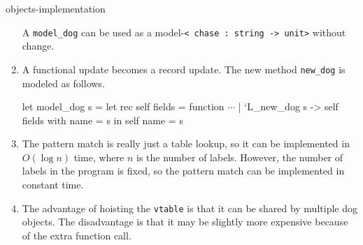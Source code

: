 \begin{exercise}{objects-implementation}
\begin{answer}
\begin{enumerate}
A \hbox{\lstinline/model_dog/} can be used as a model-\hbox{\lstinline/< chase : string -> unit>/} without change.

\item

A functional update becomes a record update.
The new method \hbox{\lstinline/new_dog/} is modeled as follows.

\begin{ocaml}
let model_dog s =
   let rec self fields = function
      $\cdots$
    | `L_new_dog s ->
        self { fields with name = s }
   in
   self { name = s }
\end{ocaml}

\item

The pattern match is really just a table lookup, so it can be implemented in $O(\log n)$ time, where
$n$ is the number of labels.  However, the number of labels in the program is fixed, so the pattern
match can be implemented in constant time.

\item

The advantage of hoisting the \hbox{\lstinline/vtable/} is that it can be shared by multiple dog objects.
The disadvantage is that it may be slightly more expensive because of the extra function call.
\end{enumerate}
\fi\end{answer}      
\end{exercise}

